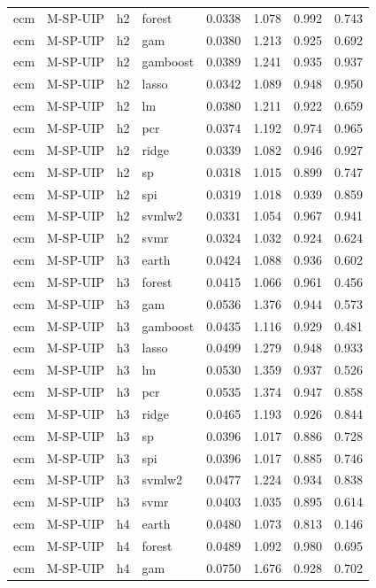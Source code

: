\begin{ThreePartTable}
\begin{longtable}[t]{llclcccc}
ecm & M-SP-UIP & h2 & forest & 0.0338 & 1.078 & 0.992 & 0.743\\
ecm & M-SP-UIP & h2 & gam & 0.0380 & 1.213 & 0.925 & 0.692\\
ecm & M-SP-UIP & h2 & gamboost & 0.0389 & 1.241 & 0.935 & 0.937\\
ecm & M-SP-UIP & h2 & lasso & 0.0342 & 1.089 & 0.948 & 0.950\\
ecm & M-SP-UIP & h2 & lm & 0.0380 & 1.211 & 0.922 & 0.659\\
ecm & M-SP-UIP & h2 & pcr & 0.0374 & 1.192 & 0.974 & 0.965\\
ecm & M-SP-UIP & h2 & ridge & 0.0339 & 1.082 & 0.946 & 0.927\\
ecm & M-SP-UIP & h2 & sp & 0.0318 & 1.015 & 0.899 & 0.747\\
ecm & M-SP-UIP & h2 & spi & 0.0319 & 1.018 & 0.939 & 0.859\\
ecm & M-SP-UIP & h2 & svmlw2 & 0.0331 & 1.054 & 0.967 & 0.941\\
ecm & M-SP-UIP & h2 & svmr & 0.0324 & 1.032 & 0.924 & 0.624\\
\addlinespace
ecm & M-SP-UIP & h3 & earth & 0.0424 & 1.088 & 0.936 & 0.602\\
ecm & M-SP-UIP & h3 & forest & 0.0415 & 1.066 & 0.961 & 0.456\\
ecm & M-SP-UIP & h3 & gam & 0.0536 & 1.376 & 0.944 & 0.573\\
ecm & M-SP-UIP & h3 & gamboost & 0.0435 & 1.116 & 0.929 & 0.481\\
ecm & M-SP-UIP & h3 & lasso & 0.0499 & 1.279 & 0.948 & 0.933\\
ecm & M-SP-UIP & h3 & lm & 0.0530 & 1.359 & 0.937 & 0.526\\
ecm & M-SP-UIP & h3 & pcr & 0.0535 & 1.374 & 0.947 & 0.858\\
ecm & M-SP-UIP & h3 & ridge & 0.0465 & 1.193 & 0.926 & 0.844\\
ecm & M-SP-UIP & h3 & sp & 0.0396 & 1.017 & 0.886 & 0.728\\
ecm & M-SP-UIP & h3 & spi & 0.0396 & 1.017 & 0.885 & 0.746\\
ecm & M-SP-UIP & h3 & svmlw2 & 0.0477 & 1.224 & 0.934 & 0.838\\
ecm & M-SP-UIP & h3 & svmr & 0.0403 & 1.035 & 0.895 & 0.614\\
\addlinespace
ecm & M-SP-UIP & h4 & earth & 0.0480 & 1.073 & 0.813 & 0.146\\
ecm & M-SP-UIP & h4 & forest & 0.0489 & 1.092 & 0.980 & 0.695\\
ecm & M-SP-UIP & h4 & gam & 0.0750 & 1.676 & 0.928 & 0.702\\

\end{longtable}
\end{ThreePartTable}
